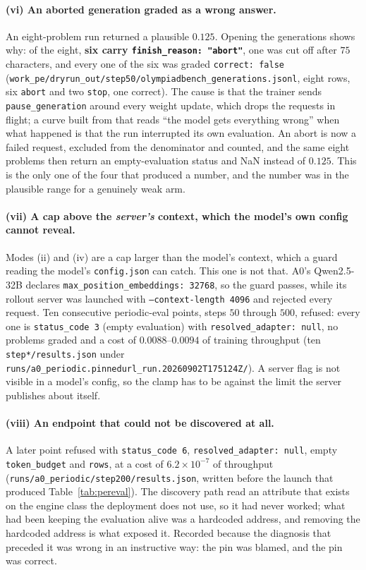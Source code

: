 \paragraph{(vi) An aborted generation graded as a wrong answer.} An eight-problem run returned
a plausible $0.125$. Opening the generations shows why: of the eight,
\textbf{six carry \texttt{finish\_reason: "abort"}}, one was cut off after $75$ characters,
and every one of the six was graded \texttt{correct: false}
(\texttt{work\_pe/dryrun\_out/step50/olympiadbench\_generations.jsonl}, eight rows, six
\texttt{abort} and two \texttt{stop}, one correct). The cause is that the trainer sends
\texttt{pause\_generation} around every weight update, which drops the requests in flight; a
curve built from that reads ``the model gets everything wrong'' when what happened is that the
run interrupted its own evaluation. An abort is now a failed request, excluded from the
denominator and counted, and the same eight problems then return an empty-evaluation status
and NaN instead of $0.125$. This is the only one of the four that produced a number, and the
number was in the plausible range for a genuinely weak arm.

\paragraph{(vii) A cap above the \emph{server's} context, which the model's own config cannot
reveal.} Modes (ii) and (iv) are a cap larger than the model's context, which a guard reading
the model's \texttt{config.json} can catch. This one is not that. A0's Qwen2.5-32B declares
\texttt{max\_position\_embeddings: 32768}, so the guard passes, while its rollout server was
launched with \texttt{--context-length 4096} and rejected every request. Ten consecutive
periodic-eval points, steps $50$ through $500$, refused: every one is
\texttt{status\_code 3} (empty evaluation) with \texttt{resolved\_adapter: null}, no problems
graded and a cost of $0.0088$--$0.0094$ of training throughput
(ten \texttt{step*/results.json} under \texttt{runs/a0\_periodic.pinnedurl\_run.20260902T175124Z/}). A
server flag is not visible in a model's config, so the clamp has to be against the limit the
server publishes about itself.

\paragraph{(viii) An endpoint that could not be discovered at all.} A later point refused with
\texttt{status\_code 6}, \texttt{resolved\_adapter: null}, empty
\texttt{token\_budget} and \texttt{rows}, at a cost of $6.2\times10^{-7}$ of throughput
(\texttt{runs/a0\_periodic/step200/results.json}, written before the launch that produced
Table~\ref{tab:pereval}). The discovery path read an attribute that exists on the engine class
the deployment does not use, so it had never worked; what had been keeping the evaluation
alive was a hardcoded address, and removing the hardcoded address is what exposed it. Recorded
because the diagnosis that preceded it was wrong in an instructive way: the pin was blamed,
and the pin was correct.


